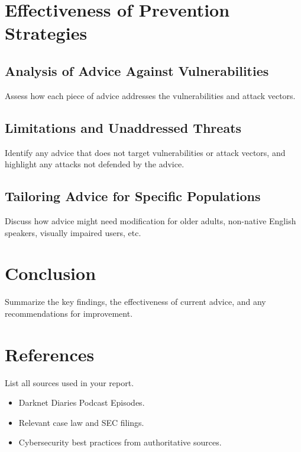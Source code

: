 \documentclass[11pt]{article}
\begin{document}
\section{Effectiveness of Prevention Strategies}
\subsection{Analysis of Advice Against Vulnerabilities}
Assess how each piece of advice addresses the vulnerabilities and attack vectors.

\subsection{Limitations and Unaddressed Threats}
Identify any advice that does not target vulnerabilities or attack vectors, and highlight any attacks not defended by the advice.

\subsection{Tailoring Advice for Specific Populations}
Discuss how advice might need modification for older adults, non-native English speakers, visually impaired users, etc.

\section{Conclusion}
Summarize the key findings, the effectiveness of current advice, and any recommendations for improvement.

\section{References}
List all sources used in your report.
\begin{itemize}
\item Darknet Diaries Podcast Episodes.
\item Relevant case law and SEC filings.
\item Cybersecurity best practices from authoritative sources.
\end{itemize}
\end{document}
